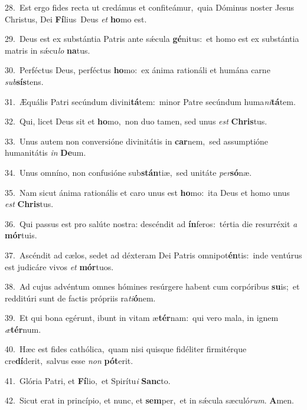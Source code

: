 {\numbfont\textcolor{\numbcolor}{28.}}~Est ergo fides recta ut credámus et confiteámur,~\dagger quia Dóminus noster Jesus Christus, Dei \textbf{Fí}\-lius~\star Deus \textit{et} \textbf{ho}\-mo est.\par
{\numbfont\textcolor{\numbcolor}{29.}}~Deus est ex substántia Patris ante sǽcula \textbf{gé}\-nitus:~\star et homo est ex substántia matris in sǽcu\textit{lo} \textbf{na}\-tus.\par
{\numbfont\textcolor{\numbcolor}{30.}}~Perféctus Deus, perféctus \textbf{ho}\-mo:~\star ex ánima rationáli et humána carne \textit{sub}\-\textbf{sís}tens.\par
{\numbfont\textcolor{\numbcolor}{31.}}~Æquális Patri secúndum divini\-\textbf{tá}\-tem:~\star minor Patre secúndum huma\-\textit{ni}\-\textbf{tá}tem.\par
{\numbfont\textcolor{\numbcolor}{32.}}~Qui, licet Deus sit et \textbf{ho}\-mo,~\star non duo tamen, sed unus \textit{est} \textbf{Chris}\-tus.\par
{\numbfont\textcolor{\numbcolor}{33.}}~Unus autem non conversióne divinitátis in \textbf{car}\-nem,~\star sed assumptióne humanitátis \textit{in} \textbf{De}\-um.\par
{\numbfont\textcolor{\numbcolor}{34.}}~Unus omníno, non confusióne sub\-\textbf{stán}\-tiæ,~\star sed unitáte \textit{per}\-\textbf{só}næ.\par
{\numbfont\textcolor{\numbcolor}{35.}}~Nam sicut ánima rationális et caro unus est \textbf{ho}\-mo:~\star ita Deus et homo unus \textit{est} \textbf{Chris}\-tus.\par
{\numbfont\textcolor{\numbcolor}{36.}}~Qui passus est pro salúte nostra: descéndit ad \textbf{ín}\-feros:~\star tértia die resurréxit \textit{a} \textbf{mór}\-tuis.\par
{\numbfont\textcolor{\numbcolor}{37.}}~Ascéndit ad cælos, sedet ad déxteram Dei Patris omnipot\-\textbf{én}\-tis:~\star inde ventúrus est judicáre vivos \textit{et} \textbf{mór}\-tuos.\par
{\numbfont\textcolor{\numbcolor}{38.}}~Ad cujus advéntum omnes hómines resúrgere habent cum corpóribus \textbf{su}\-is;~\star et redditúri sunt de factis própriis ra\-\textit{ti}\-\textbf{ó}nem.\par
{\numbfont\textcolor{\numbcolor}{39.}}~Et qui bona egérunt, ibunt in vitam æ\-\textbf{tér}\-nam:~\star qui vero mala, in ignem \textit{æ}\-\textbf{tér}num.\par
{\numbfont\textcolor{\numbcolor}{40.}}~Hæc est fides cathólica,~\dagger quam nisi quisque fidéliter firmitérque cre\-\textbf{dí}\-derit,~\star salvus esse \textit{non} \textbf{pót}\-erit.\par
{\numbfont\textcolor{\numbcolor}{41.}}~Glória Patri, et \textbf{Fí}\-lio,~\star et Spirítu\textit{i} \textbf{Sanc}\-to.\par
{\numbfont\textcolor{\numbcolor}{42.}}~Sicut erat in princípio, et nunc, et \textbf{sem}\-per,~\star et in sǽcula sæculó\-\textit{rum}\-. \textbf{A}\-men.\par
